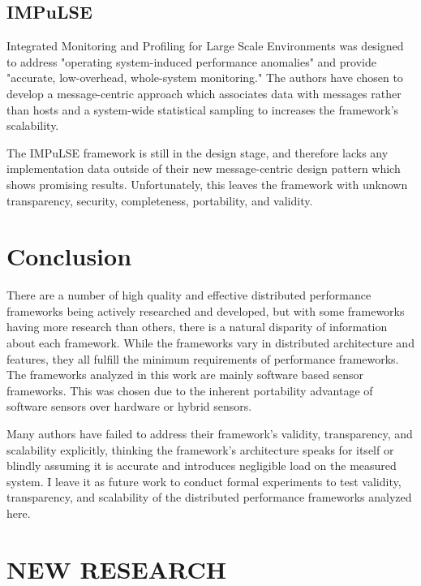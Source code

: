 \subsection{IMPuLSE}

Integrated Monitoring and Profiling for Large Scale Environments \cite{bridges2004} was designed to address "operating
system-induced performance anomalies" and provide "accurate, low-overhead, whole-system monitoring." The authors have
chosen to develop a message-centric approach which associates data with messages rather than hosts and a system-wide
statistical sampling to increases the framework's scalability.

The IMPuLSE framework is still in the design stage, and therefore lacks any implementation data outside of their new
message-centric design pattern which shows promising results. Unfortunately, this leaves the framework with unknown
transparency, security, completeness, portability, and validity.

\section{Conclusion}

There are a number of high quality and effective distributed performance frameworks being actively researched and
developed, but with some frameworks having more research than others, there is a natural disparity of information about
each framework. While the frameworks vary in distributed architecture and features, they all fulfill the minimum
requirements of performance frameworks. The frameworks analyzed in this work are mainly software based sensor
frameworks. This was chosen due to the inherent portability advantage of software sensors over hardware or hybrid
sensors.

Many authors have failed to address their framework's validity, transparency, and scalability explicitly, thinking the
framework's architecture speaks for itself or blindly assuming it is accurate and introduces negligible load on the
measured system. I leave it as future work to conduct formal experiments to test validity, transparency, and scalability
of the distributed performance frameworks analyzed here.

\section{NEW RESEARCH}

